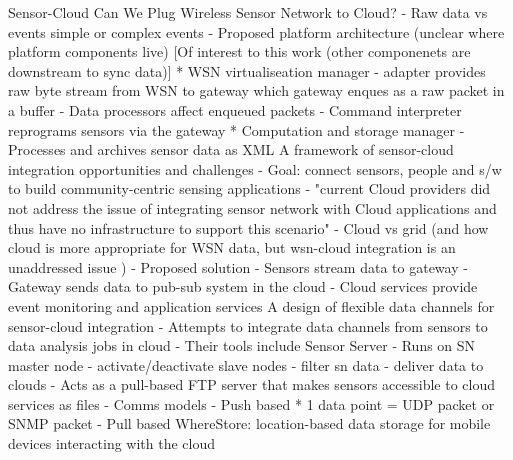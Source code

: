 		Sensor-Cloud
			Can We Plug Wireless Sensor Network to Cloud?
				- Raw data vs events
					simple or complex events
				- Proposed platform architecture (unclear where platform components live)
					[Of interest to this work (other componenets are downstream to sync data)]
					* WSN virtualiseation manager
						- adapter provides raw byte stream from WSN to gateway which gateway enques as a raw packet in a buffer
						- Data processors affect enqueued packets
						- Command interpreter reprograms sensors via the gateway
					* Computation and storage manager
						- Processes and archives sensor data as XML
			A framework of sensor-cloud integration opportunities and challenges
				- Goal: connect sensors, people and s/w to build community-centric sensing applications
				- "current Cloud providers did not address the issue of integrating sensor network with Cloud applications and thus have no infrastructure to support this scenario"
				- Cloud vs grid (and how cloud is more appropriate for WSN data, but wsn-cloud integration is an unaddressed issue )
				- Proposed solution
					- Sensors stream data to gateway
					- Gateway sends data to pub-sub system in the cloud
					- Cloud services provide event monitoring and application services
			A design of flexible data channels for sensor-cloud integration
				- Attempts to integrate data channels from sensors to data analysis jobs in cloud
				- Their tools include Sensor Server
					- Runs on SN master node
					- activate/deactivate slave nodes
					- filter sn data
					- deliver data to clouds
					- Acts as a pull-based FTP server that makes sensors accessible to cloud services as files
				- Comms models
					- Push based
						* 1 data point = UDP packet or SNMP packet
					- Pull based				
			WhereStore: location-based data storage for mobile devices interacting with the cloud
